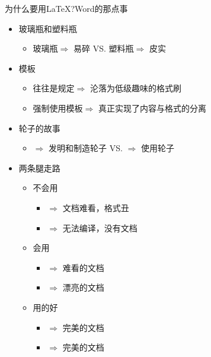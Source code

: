 \documentclass[fontset = none, xcolor=svgnames, t, aspectratio=169]{ctexbeamer}
\begin{document}
\begin{frame}{为什么要用\LaTeX?}{Word的那点事}
  \stretchon
  \begin{itemize}
  \item 玻璃瓶和塑料瓶
    \begin{itemize}
    \item \msoffice 玻璃瓶$\Rightarrow$ \alert{易碎} VS. \latex 塑料瓶$\Rightarrow$ \alert{皮实}
    \end{itemize}
  \item 模板
    \begin{itemize}
    \item \msoffice 往往是\alert{规定}$\Rightarrow$ 沦落为低级趣味的\alert{格式刷}
    \item \latex 强制使用模板$\Rightarrow$ 真正实现了\alert{内容与格式的分离}
    \end{itemize}
  \item 轮子的故事
    \begin{itemize}
    \item \msoffice$\Rightarrow$ \alert{ 发明和制造}轮子  VS. \latex$\Rightarrow$  \alert{ 使用}轮子
    \end{itemize}
  \item 两条腿走路
    \begin{itemize}      
    \item 不会用
      \begin{itemize}
      \item \msoffice $\Rightarrow$ 文档难看，格式丑
      \item \latex $\Rightarrow$ 无法编译，\alert{没有文档}
      \end{itemize}
    \item 会用
      \begin{itemize}
      \item \msoffice $\Rightarrow$ \alert{难看}的文档
      \item \latex $\Rightarrow$ 漂亮的文档
      \end{itemize}
    \item 用的好
      \begin{itemize}
      \item \msoffice $\Rightarrow$ \alert{完美}的文档
      \item \latex $\Rightarrow$ \alert{完美}的文档
      \end{itemize}
    \end{itemize}    
  \end{itemize}
  \stretchoff
\end{frame}
\end{document}
